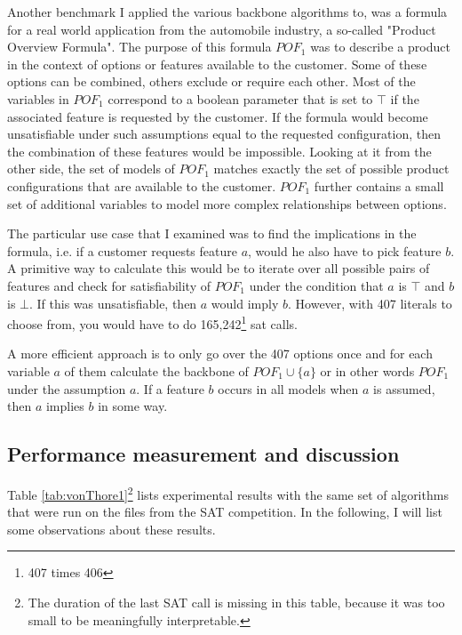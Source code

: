 Another benchmark I applied the various backbone algorithms to, was a formula for a real world application from the automobile industry, a so-called "Product Overview Formula". The purpose of this formula $POF_1$ was to describe a product in the context of options or features available to the customer. Some of these options can be combined, others exclude or require each other. Most of the variables in $POF_1$ correspond to a boolean parameter that is set to $\top$ if the associated feature is requested by the customer. If the formula would become unsatisfiable under such assumptions equal to the requested configuration, then the combination of these features would be impossible. Looking at it from the other side, the set of models of $POF_1$ matches exactly the set of possible product configurations that are available to the customer. $POF_1$ further contains a small set of additional variables to model more complex relationships between options.

The particular use case that I examined was to find the implications in the formula, i.e. if a customer requests feature $a$, would he also have to pick feature $b$. A primitive way to calculate this would be to iterate over all possible pairs of features 
and check for satisfiability of $POF_1$ under the condition that $a$ is $\top$ and $b$ is $\bot$. If this was unsatisfiable, then $a$ would imply $b$. However, with 407 literals to choose from, you would have to do 165,242\footnote{407 times 406} sat calls. 

A more efficient approach is to only go over the 407 options once and for each variable $a$ of them calculate the backbone of $POF_1 \cup \{a\}$ or in other words $POF_1$ under the assumption $a$. If a feature $b$ occurs in all models when $a$ is assumed, then $a$ implies $b$ in some way.


\subsection{Performance measurement and discussion}
Table \ref{tab:vonThore1}\footnote{The duration of the last SAT call is missing in this table, because it was too small to be meaningfully interpretable.} lists experimental results with the same set of algorithms that were run on the files from the SAT competition. In the following, I will list some observations about these results.

